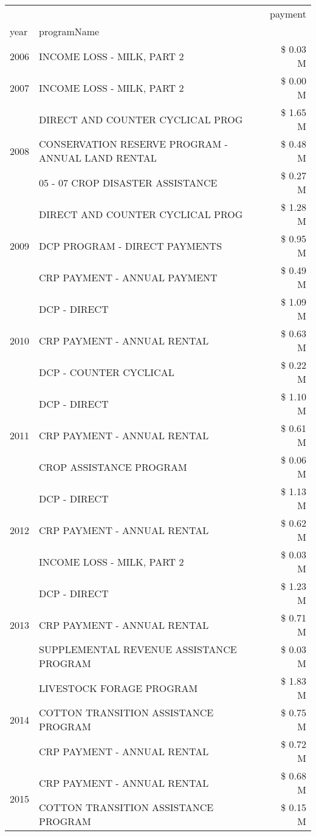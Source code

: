 \begin{tabular}{llr}
\toprule
 &  & payment \\
year & programName &  \\
\midrule
2006 & INCOME LOSS - MILK, PART 2 & \$ 0.03 M \\
\cline{1-3}
2007 & INCOME LOSS - MILK, PART 2 & \$ 0.00 M \\
\cline{1-3}
\multirow[t]{3}{*}{2008} & DIRECT AND COUNTER CYCLICAL PROG & \$ 1.65 M \\
 & CONSERVATION RESERVE PROGRAM - ANNUAL LAND RENTAL & \$ 0.48 M \\
 & 05 - 07 CROP DISASTER ASSISTANCE & \$ 0.27 M \\
\cline{1-3}
\multirow[t]{3}{*}{2009} & DIRECT AND COUNTER CYCLICAL PROG & \$ 1.28 M \\
 & DCP PROGRAM - DIRECT PAYMENTS & \$ 0.95 M \\
 & CRP PAYMENT - ANNUAL PAYMENT & \$ 0.49 M \\
\cline{1-3}
\multirow[t]{3}{*}{2010} & DCP - DIRECT & \$ 1.09 M \\
 & CRP PAYMENT - ANNUAL RENTAL & \$ 0.63 M \\
 & DCP - COUNTER CYCLICAL & \$ 0.22 M \\
\cline{1-3}
\multirow[t]{3}{*}{2011} & DCP - DIRECT & \$ 1.10 M \\
 & CRP PAYMENT - ANNUAL RENTAL & \$ 0.61 M \\
 & CROP ASSISTANCE PROGRAM & \$ 0.06 M \\
\cline{1-3}
\multirow[t]{3}{*}{2012} & DCP - DIRECT & \$ 1.13 M \\
 & CRP PAYMENT - ANNUAL RENTAL & \$ 0.62 M \\
 & INCOME LOSS - MILK, PART 2 & \$ 0.03 M \\
\cline{1-3}
\multirow[t]{3}{*}{2013} & DCP - DIRECT & \$ 1.23 M \\
 & CRP PAYMENT - ANNUAL RENTAL & \$ 0.71 M \\
 & SUPPLEMENTAL REVENUE ASSISTANCE PROGRAM & \$ 0.03 M \\
\cline{1-3}
\multirow[t]{3}{*}{2014} & LIVESTOCK FORAGE PROGRAM & \$ 1.83 M \\
 & COTTON TRANSITION ASSISTANCE PROGRAM & \$ 0.75 M \\
 & CRP PAYMENT - ANNUAL RENTAL & \$ 0.72 M \\
\cline{1-3}
\multirow[t]{3}{*}{2015} & CRP PAYMENT - ANNUAL RENTAL & \$ 0.68 M \\
 & COTTON TRANSITION ASSISTANCE PROGRAM & \$ 0.15 M \\

\end{tabular}
